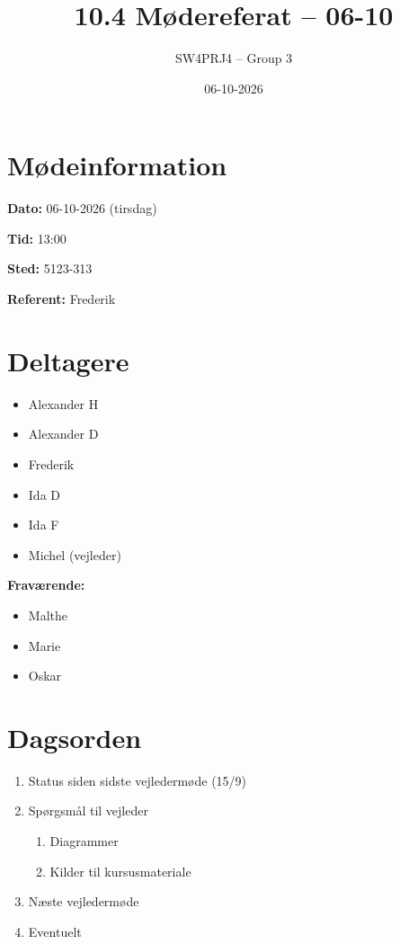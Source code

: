 \documentclass[a4paper,11pt]{article}
\title{10.4 Mødereferat -- 06-10}
\author{SW4PRJ4 -- Group 3}
\date{06-10-2026}
\begin{document}
\maketitle

\section*{Mødeinformation}

\textbf{Dato:} 06-10-2026 (tirsdag)

\textbf{Tid:} 13:00

\textbf{Sted:} 5123-313

\textbf{Referent:} Frederik

\section*{Deltagere}

\begin{itemize}
    \item Alexander H
    \item Alexander D
    \item Frederik
    \item Ida D
    \item Ida F
    \item Michel (vejleder)
\end{itemize}

\textbf{Fraværende:}

\begin{itemize}
    \item Malthe
    \item Marie
    \item Oskar
\end{itemize}

\section*{Dagsorden}

\begin{enumerate}
    \item Status siden sidste vejledermøde (15/9)
    \item Spørgsmål til vejleder
    \begin{enumerate}
        \item Diagrammer
        \item Kilder til kursusmateriale
    \end{enumerate}
    \item Næste vejledermøde
    \item Eventuelt
\end{enumerate}
\end{document}
